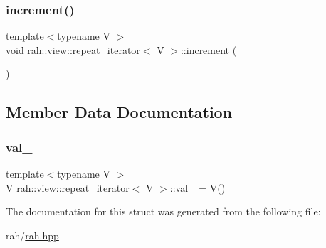 \mbox{\label{structrah_1_1view_1_1repeat__iterator_a5556f69de4c759f4fec42c12d70ea869}} 
\subsubsection{\texorpdfstring{increment()}{increment()}}
{\footnotesize\ttfamily template$<$typename V $>$ \\
void \mbox{\hyperlink{structrah_1_1view_1_1repeat__iterator}{rah\+::view\+::repeat\+\_\+iterator}}$<$ V $>$\+::increment (\begin{DoxyParamCaption}{ }\end{DoxyParamCaption})\hspace{0.3cm}{\ttfamily [inline]}}



\subsection{Member Data Documentation}
\mbox{\label{structrah_1_1view_1_1repeat__iterator_a6286ca38cb848630cb870dc6ab42eb79}} 
\subsubsection{\texorpdfstring{val\_}{val\_}}
{\footnotesize\ttfamily template$<$typename V $>$ \\
V \mbox{\hyperlink{structrah_1_1view_1_1repeat__iterator}{rah\+::view\+::repeat\+\_\+iterator}}$<$ V $>$\+::val\+\_\+ = V()}



The documentation for this struct was generated from the following file\+:\begin{DoxyCompactItemize}
\item 
rah/\mbox{\hyperlink{rah_8hpp}{rah.\+hpp}}\end{DoxyCompactItemize}

